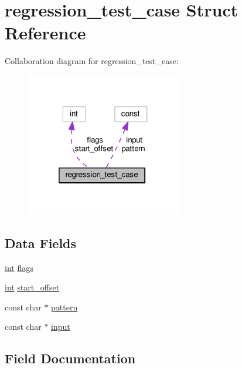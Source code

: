\hypertarget{structregression__test__case}{}\section{regression\+\_\+test\+\_\+case Struct Reference}
\label{structregression__test__case}


Collaboration diagram for regression\+\_\+test\+\_\+case\+:
\nopagebreak
\begin{figure}[H]
\begin{center}
\leavevmode
\includegraphics[width=193pt]{structregression__test__case__coll__graph}
\end{center}
\end{figure}
\subsection*{Data Fields}
\begin{DoxyCompactItemize}
\item 
\hyperlink{pcre_8txt_a42dfa4ff673c82d8efe7144098fbc198}{int} \hyperlink{structregression__test__case_a0f4c8efb9e0ff97652926c31e2fb4579}{flags}
\item 
\hyperlink{pcre_8txt_a42dfa4ff673c82d8efe7144098fbc198}{int} \hyperlink{structregression__test__case_aa1ffb94a5765c8f2ad60267e6ed9d1ce}{start\+\_\+offset}
\item 
const char $\ast$ \hyperlink{structregression__test__case_afe682a8f69ae51686321c172e8f6cfd7}{pattern}
\item 
const char $\ast$ \hyperlink{structregression__test__case_ad8071e82f7a35dd430bbb43da66ea44e}{input}
\end{DoxyCompactItemize}


\subsection{Field Documentation}
